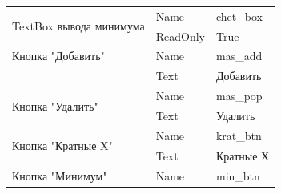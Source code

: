 \begin{table}[H]
\begin{tabular}{|l|l|l|}
\multirow{2}{*}{TextBox вывода минимума}                                    & Name                                                                           & chet\_box                                                                     \\ \cline{2-3} 
                                                                            & ReadOnly                                                                       & True                                                                          \\ \hline
Кнопка "Добавить"                                                           & Name                                                                           & mas\_add                                                                      \\ \hline
                                                                            & Text                                                                           & Добавить                                                                      \\ \hline
\multirow{2}{*}{Кнопка "Удалить"}                                           & Name                                                                           & mas\_pop                                                                      \\ \cline{2-3} 
                                                                            & Text                                                                           & Удалить                                                                       \\ \hline
\multirow{2}{*}{Кнопка "Кратные X"}                                         & Name                                                                           & krat\_btn                                                                     \\ \cline{2-3} 
                                                                            & Text                                                                           & Кратные Х                                                                     \\ \hline
\multirow{2}{*}{Кнопка "Минимум"}                                           & Name                                                                           & min\_btn                                                                      \\ \cline{2-3} 

\end{tabular}
\end{table}
